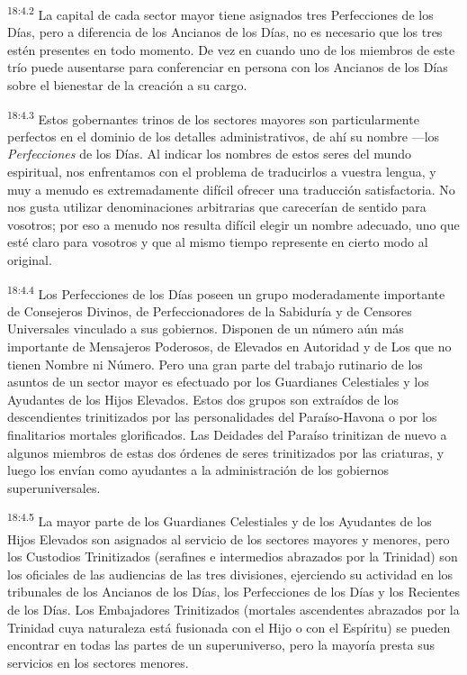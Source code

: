 \par
\textsuperscript{18:4.2} La capital de cada sector mayor tiene asignados tres Perfecciones de los Días, pero a diferencia de los Ancianos de los Días, no es necesario que los tres estén presentes en todo momento. De vez en cuando uno de los miembros de este trío puede ausentarse para conferenciar en persona con los Ancianos de los Días sobre el bienestar de la creación a su cargo.

\par
\textsuperscript{18:4.3} Estos gobernantes trinos de los sectores mayores son particularmente perfectos en el dominio de los detalles administrativos, de ahí su nombre ---los \textit{Perfecciones} de los Días. Al indicar los nombres de estos seres del mundo espiritual, nos enfrentamos con el problema de traducirlos a vuestra lengua, y muy a menudo es extremadamente difícil ofrecer una traducción satisfactoria. No nos gusta utilizar denominaciones arbitrarias que carecerían de sentido para vosotros; por eso a menudo nos resulta difícil elegir un nombre adecuado, uno que esté claro para vosotros y que al mismo tiempo represente en cierto modo al original.

\par
\textsuperscript{18:4.4} Los Perfecciones de los Días poseen un grupo moderadamente importante de Consejeros Divinos, de Perfeccionadores de la Sabiduría y de Censores Universales vinculado a sus gobiernos. Disponen de un número aún más importante de Mensajeros Poderosos, de Elevados en Autoridad y de Los que no tienen Nombre ni Número. Pero una gran parte del trabajo rutinario de los asuntos de un sector mayor es efectuado por los Guardianes Celestiales y los Ayudantes de los Hijos Elevados. Estos dos grupos son extraídos de los descendientes trinitizados por las personalidades del Paraíso-Havona o por los finalitarios mortales glorificados. Las Deidades del Paraíso trinitizan de nuevo a algunos miembros de estas dos órdenes de seres trinitizados por las criaturas, y luego los envían como ayudantes a la administración de los gobiernos superuniversales.

\par
\textsuperscript{18:4.5} La mayor parte de los Guardianes Celestiales y de los Ayudantes de los Hijos Elevados son asignados al servicio de los sectores mayores y menores, pero los Custodios Trinitizados (serafines e intermedios abrazados por la Trinidad) son los oficiales de las audiencias de las tres divisiones, ejerciendo su actividad en los tribunales de los Ancianos de los Días, los Perfecciones de los Días y los Recientes de los Días. Los Embajadores Trinitizados (mortales ascendentes abrazados por la Trinidad cuya naturaleza está fusionada con el Hijo o con el Espíritu) se pueden encontrar en todas las partes de un superuniverso, pero la mayoría presta sus servicios en los sectores menores.

